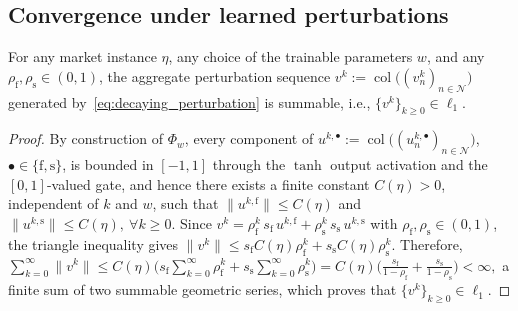 \documentclass[final]{l4dc2026}
\begin{document}
\subsection{Convergence under learned perturbations}
\begin{lemma}
\label{lem:summability}
For any market instance $\eta$, any choice of the trainable parameters $w$, and any \(\rho_{\mathrm f},\rho_{\mathrm s}\in(0,1)\), the aggregate perturbation sequence $v^k:=\operatorname{col}\bigl((v_n^k)_{n\in\mathcal N}\bigr)$
generated by~\eqref{eq:decaying_perturbation} is summable, i.e., $\{v^k\}_{k\geq0}\in\ell_1.$
\end{lemma}

\begin{proof}
By construction of \(\Phi_w\), every component of \(u^{k,\bullet}:=\operatorname{col}\bigl((u_n^{k,\bullet})_{n\in\mathcal N}\bigr)\), $\bullet\in\{\mathrm f,\mathrm s\}$, is bounded in $[-1,1]$ through the $\operatorname{tanh}$ output activation and the $[0,1]$-valued gate, and hence there exists a finite constant \(C(\eta)>0\), independent of \(k\) and \(w\), such that
$\|u^{k,\mathrm f}\|\leq C(\eta)$ and $\|u^{k,\mathrm s}\|\leq C(\eta),\ \forall k\geq0.$
Since \(v^k=\rho_{\mathrm f}^k\, s_{\mathrm f}\, u^{k,\mathrm f} + \rho_{\mathrm s}^k\, s_{\mathrm s}\, u^{k,\mathrm s}\) with \(\rho_{\mathrm f},\rho_{\mathrm s}\in(0,1)\), the triangle inequality gives
$
\|v^k\|
\leq
s_{\mathrm f} C(\eta)\rho_{\mathrm f}^k + s_{\mathrm s} C(\eta)\rho_{\mathrm s}^k.
$
Therefore, $\sum_{k=0}^{\infty}\|v^k\|\leq C(\eta)\Big(s_{\mathrm f}\sum_{k=0}^{\infty}\rho_{\mathrm f}^k + s_{\mathrm s}\sum_{k=0}^{\infty}\rho_{\mathrm s}^k\Big)
=C(\eta)\Big(\frac{s_{\mathrm f}}{1-\rho_{\mathrm f}}+\frac{s_{\mathrm s}}{1-\rho_{\mathrm s}}\Big)<\infty,$
a finite sum of two summable geometric series, which proves that \(\{v^k\}_{k\geq0}\in\ell_1\).
\end{proof}
\end{document}

